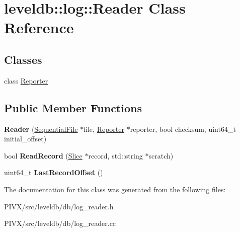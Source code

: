 \hypertarget{classleveldb_1_1log_1_1_reader}{}\section{leveldb\+:\+:log\+:\+:Reader Class Reference}
\label{classleveldb_1_1log_1_1_reader}
\subsection*{Classes}
\begin{DoxyCompactItemize}
\item 
class \mbox{\hyperlink{classleveldb_1_1log_1_1_reader_1_1_reporter}{Reporter}}
\end{DoxyCompactItemize}
\subsection*{Public Member Functions}
\begin{DoxyCompactItemize}
\item 
\mbox{\label{classleveldb_1_1log_1_1_reader_a38c1a9988741af5429dad60cf79f0556}} 
{\bfseries Reader} (\mbox{\hyperlink{classleveldb_1_1_sequential_file}{Sequential\+File}} $\ast$file, \mbox{\hyperlink{classleveldb_1_1log_1_1_reader_1_1_reporter}{Reporter}} $\ast$reporter, bool checksum, uint64\+\_\+t initial\+\_\+offset)
\item 
\mbox{\label{classleveldb_1_1log_1_1_reader_a84059598c9367cb677a9d70d77993282}} 
bool {\bfseries Read\+Record} (\mbox{\hyperlink{classleveldb_1_1_slice}{Slice}} $\ast$record, std\+::string $\ast$scratch)
\item 
\mbox{\label{classleveldb_1_1log_1_1_reader_a358c5545069d86a61948ac0a021aa7f6}} 
uint64\+\_\+t {\bfseries Last\+Record\+Offset} ()
\end{DoxyCompactItemize}


The documentation for this class was generated from the following files\+:\begin{DoxyCompactItemize}
\item 
P\+I\+V\+X/src/leveldb/db/log\+\_\+reader.\+h\item 
P\+I\+V\+X/src/leveldb/db/log\+\_\+reader.\+cc\end{DoxyCompactItemize}
